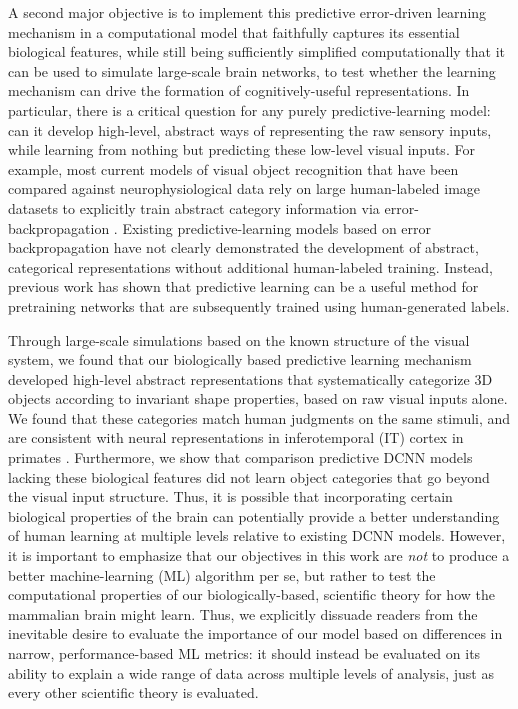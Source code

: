 \documentclass[11pt,twoside]{article}
\newif\myifpdf
\begin{document}
A second major objective is to implement this predictive error-driven learning mechanism in a computational model that faithfully captures its essential biological features, while still being sufficiently simplified computationally that it can be used to simulate large-scale brain networks, to test whether the learning mechanism can drive the formation of cognitively-useful representations.  In particular, there is a critical question for any purely predictive-learning model: can it develop high-level, abstract ways of representing the raw sensory inputs, while learning from nothing but predicting these low-level visual inputs.  For example, most current models of visual object recognition that have been compared against neurophysiological data rely on large human-labeled image datasets to explicitly train abstract category information via error-backpropagation \cite{CadieuHongYaminsEtAl14,RajalinghamIssaBashivanEtAl18}.  Existing predictive-learning models based on error backpropagation \cite{LotterKreimanCox16} have not clearly demonstrated the development of abstract, categorical representations without additional human-labeled training.  Instead, previous work has shown that predictive learning can be a useful method for pretraining networks that are subsequently trained using human-generated labels.

Through large-scale simulations based on the known structure of the visual system, we found that our biologically based predictive learning mechanism developed high-level abstract representations that systematically categorize 3D objects according to invariant shape properties, based on raw visual inputs alone.  We found that these categories match human judgments on the same stimuli, and are consistent with neural representations in inferotemporal (IT) cortex in primates \cite{CadieuHongYaminsEtAl14}.  Furthermore, we show that comparison predictive DCNN models lacking these biological features \cite{LotterKreimanCox16} did not learn object categories that go beyond the visual input structure.  Thus, it is possible that incorporating certain biological properties of the brain can potentially provide a better understanding of human learning at multiple levels relative to existing DCNN models.  However, it is important to emphasize that our objectives in this work are \emph{not} to produce a better machine-learning (ML) algorithm per se, but rather to test the computational properties of our biologically-based, scientific theory for how the mammalian brain might learn.  Thus, we explicitly dissuade readers from the inevitable desire to evaluate the importance of our model based on differences in narrow, performance-based ML metrics: it should instead be evaluated on its ability to explain a wide range of data across multiple levels of analysis, just as every other scientific theory is evaluated.
\end{document}
